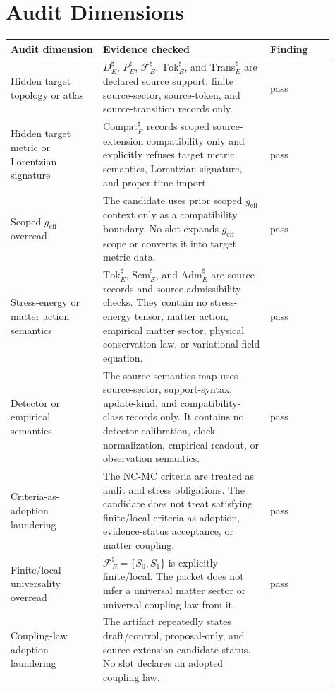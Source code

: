 \documentclass[11pt]{article}
\newcommand{\geff}{g_{\mathrm{eff}}}
\newcommand{\Tok}{\mathrm{Tok}}
\newcommand{\Sem}{\mathrm{Sem}}
\newcommand{\Adm}{\mathrm{Adm}}
\newcommand{\Trans}{\mathrm{Trans}}
\newcommand{\Compat}{\mathrm{Compat}}
\newcommand{\Fsrc}{\mathcal{F}_{E}^{\sharp}}
\begin{document}
\section{Audit Dimensions}

\begin{longtable}{p{0.26\linewidth}p{0.47\linewidth}p{0.18\linewidth}}
\toprule
Audit dimension & Evidence checked & Finding \\
\midrule
Hidden target topology or atlas &
\(D_E^{\sharp}\), \(P_E^{\sharp}\), \(\Fsrc\), \(\Tok_E^{\sharp}\), and
\(\Trans_E^{\sharp}\) are declared source support, finite source-sector,
source-token, and source-transition records only. & pass \\
\addlinespace
Hidden target metric or Lorentzian signature &
\(\Compat_E^{\sharp}\) records scoped source-extension compatibility only and
explicitly refuses target metric semantics, Lorentzian signature, and proper
time import. & pass \\
\addlinespace
Scoped \(\geff\) overread &
The candidate uses prior scoped \(\geff\) context only as a compatibility
boundary. No slot expands \(\geff\) scope or converts it into target metric
data. & pass \\
\addlinespace
Stress-energy or matter action semantics &
\(\Tok_E^{\sharp}\), \(\Sem_E^{\sharp}\), and \(\Adm_E^{\sharp}\) are source
records and source admissibility checks. They contain no stress-energy tensor,
matter action, empirical matter sector, physical conservation law, or
variational field equation. & pass \\
\addlinespace
Detector or empirical semantics &
The source semantics map uses source-sector, support-syntax, update-kind, and
compatibility-class records only. It contains no detector calibration,
clock normalization, empirical readout, or observation semantics. & pass \\
\addlinespace
Criteria-as-adoption laundering &
The NC-MC criteria are treated as audit and stress obligations. The candidate
does not treat satisfying finite/local criteria as adoption, evidence-status
acceptance, or matter coupling. & pass \\
\addlinespace
Finite/local universality overread &
\(\Fsrc=\{S_0,S_1\}\) is explicitly finite/local. The packet does not infer a
universal matter sector or universal coupling law from it. & pass \\
\addlinespace
Coupling-law adoption laundering &
The artifact repeatedly states draft/control, proposal-only, and
source-extension candidate status. No slot declares an adopted coupling law. &

\end{longtable}
\end{document}
